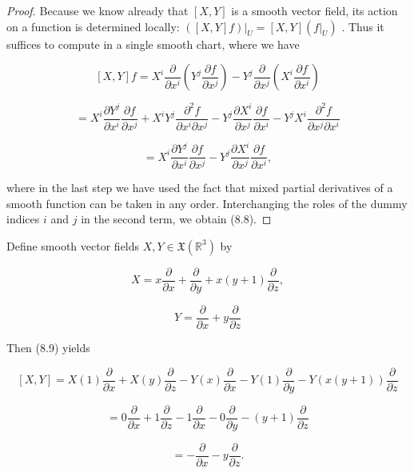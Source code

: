 \begin{proof}
\leanok
Because we know already that $\left\lbrack  {X, Y}\right\rbrack$ is a smooth vector field, its action on a function is determined locally: ${\left. \left( \left\lbrack  X, Y\right\rbrack  f\right) \right| }_{U} = \left\lbrack  {X, Y}\right\rbrack  \left( {\left. f\right| }_{U}\right)$ . Thus it suffices to compute in a single smooth chart, where we have

\[
\left\lbrack  {X, Y}\right\rbrack  f = {X}^{i}\frac{\partial }{\partial {x}^{i}}\left( {{Y}^{j}\frac{\partial f}{\partial {x}^{j}}}\right)  - {Y}^{j}\frac{\partial }{\partial {x}^{j}}\left( {{X}^{i}\frac{\partial f}{\partial {x}^{i}}}\right)
\]

\[
= {X}^{i}\frac{\partial {Y}^{j}}{\partial {x}^{i}}\frac{\partial f}{\partial {x}^{j}} + {X}^{i}{Y}^{j}\frac{{\partial }^{2}f}{\partial {x}^{i}\partial {x}^{j}} - {Y}^{j}\frac{\partial {X}^{i}}{\partial {x}^{j}}\frac{\partial f}{\partial {x}^{i}} - {Y}^{j}{X}^{i}\frac{{\partial }^{2}f}{\partial {x}^{j}\partial {x}^{i}}
\]

\[
= {X}^{i}\frac{\partial {Y}^{j}}{\partial {x}^{i}}\frac{\partial f}{\partial {x}^{j}} - {Y}^{j}\frac{\partial {X}^{i}}{\partial {x}^{j}}\frac{\partial f}{\partial {x}^{i}},
\]

where in the last step we have used the fact that mixed partial derivatives of a smooth function can be taken in any order. Interchanging the roles of the dummy indices $i$ and $j$ in the second term, we obtain (8.8).
\end{proof}

\begin{example}
\label{ex:8-27}
\leanok
{}
Define smooth vector fields $X, Y \in  \mathfrak{X}\left( {\mathbb{R}}^{3}\right)$ by

\[
X = x\frac{\partial }{\partial x} + \frac{\partial }{\partial y} + x\left( {y + 1}\right) \frac{\partial }{\partial z},
\]

\[
Y = \frac{\partial }{\partial x} + y\frac{\partial }{\partial z}
\]

Then (8.9) yields

\[
\left\lbrack  {X, Y}\right\rbrack   = X\left( 1\right) \frac{\partial }{\partial x} + X\left( y\right) \frac{\partial }{\partial z} - Y\left( x\right) \frac{\partial }{\partial x} - Y\left( 1\right) \frac{\partial }{\partial y} - Y\left( {x\left( {y + 1}\right) }\right) \frac{\partial }{\partial z}
\]

\[
= 0\frac{\partial }{\partial x} + 1\frac{\partial }{\partial z} - 1\frac{\partial }{\partial x} - 0\frac{\partial }{\partial y} - \left( {y + 1}\right) \frac{\partial }{\partial z}
\]

\[
=  - \frac{\partial }{\partial x} - y\frac{\partial }{\partial z}.
\]
\end{example}

